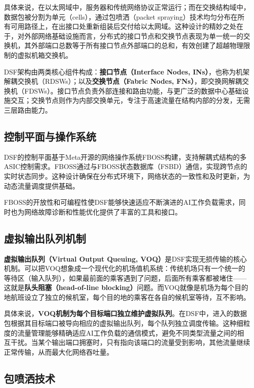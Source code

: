 具体来说，在以太网域中，服务器和传统网络协议正常运行；而在交换结构域中，数据包被分割为单元（cells），通过包喷洒（packet spraying）技术均匀分布在所有可用路径上，在出接口处重新组装后交付给以太网域。这种设计的精妙之处在于，对外部网络基础设施而言，分布式的接口节点和交换节点表现为单一统一的交换机，其外部端口总数等于所有接口节点外部端口的总和，有效创建了超越物理限制的虚拟机箱交换机。

DSF架构由两类核心组件构成：\textbf{接口节点（Interface Nodes, INs）}，也称为机架解耦交换机（RDSWs）；以及\textbf{交换节点（Fabric Nodes, FNs）}，即交换网解耦交换机（FDSWs）。接口节点负责外部连接和路由功能，与更广泛的数据中心基础设施交互；交换节点则作为内部交换单元，专注于高速流量在结构内部的分发，无需三层路由能力。

\subsection{控制平面与操作系统}

DSF的控制平面基于Meta开源的网络操作系统FBOSS构建，支持解耦式结构的多ASIC控制需求。FBOSS通过与FBOSS状态数据库（FSBD）通信，实现跨节点的实时状态同步。这种设计确保在分布式环境下，网络状态的一致性和及时更新，为动态流量调度提供基础。

FBOSS的开放性和可编程性使DSF能够快速适应不断演进的AI工作负载需求，同时也为网络故障诊断和性能优化提供了丰富的工具和接口。

\subsection{虚拟输出队列机制}

\textbf{虚拟输出队列（Virtual Output Queuing, VOQ）}是DSF实现无损传输的核心机制。可以把VOQ想象成一个现代化的机场值机系统：传统机场只有一个统一的等待区（输入队列），如果最前面的乘客遇到了问题，后面所有乘客都被堵住——这就是\textbf{队头阻塞（head-of-line blocking）}问题。而VOQ就像是机场为每个目的地航班设立了独立的候机室，每个目的地的乘客在各自的候机室等待，互不影响。

具体来说，\textbf{VOQ机制为每个目标端口独立维护虚拟队列}。在DSF中，进入的数据包根据其目标端口被导向相应的虚拟输出队列，每个队列独立调度传输。这种细粒度的流量管理能够精确适应AI工作负载的通信模式，避免不同类型流量之间的相互干扰。当某个输出端口拥塞时，只有指向该端口的流量受到影响，其他流量继续正常传输，从而最大化网络吞吐量。

\subsection{包喷洒技术}

